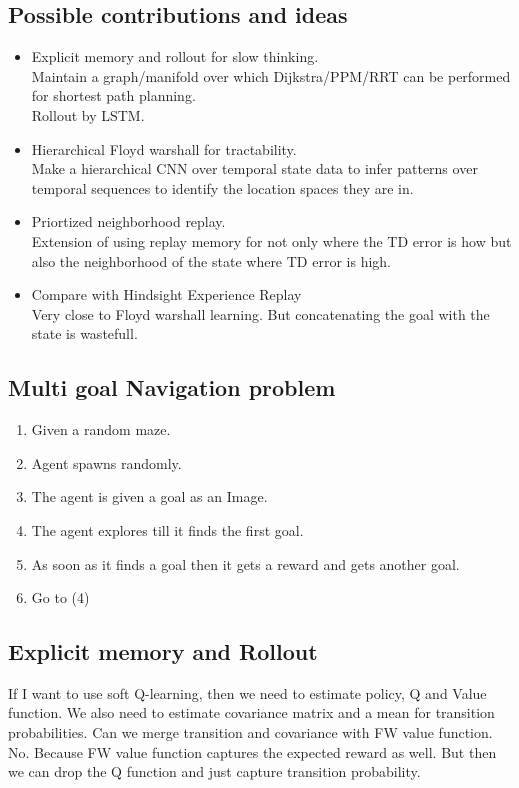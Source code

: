 \subsection{Possible contributions and ideas}
\begin{itemize}
\item Explicit memory and rollout for slow thinking.
  \\
  Maintain a graph/manifold over which Dijkstra/PPM/RRT can be
  performed for shortest path planning.
  \\
  Rollout by LSTM.
\item Hierarchical Floyd warshall for tractability.
  \\
  Make a hierarchical CNN over temporal state data to infer patterns
  over temporal sequences to identify the location spaces they are in.
\item Priortized neighborhood replay.
  \\
  Extension of using replay memory for not only where the TD error is
  how but also the neighborhood of the state where TD error is high.
\item Compare with Hindsight Experience Replay
  \\
  Very close to Floyd warshall learning.
  But concatenating the goal with the state is wastefull.
\end{itemize}

\subsection{Multi goal Navigation problem}
\begin{enumerate}
\item Given a random maze.
\item Agent spawns randomly.
\item The agent is given a goal as an Image.
\item The agent explores till it finds the first goal.
\item As soon as it finds a goal then it gets a reward and gets another goal.
\item Go to (4)
\end{enumerate}

\subsection{Explicit memory and Rollout}

If I want to use soft Q-learning, then we need to estimate policy, Q
and Value function. We also need to estimate covariance matrix and a
mean for transition probabilities.
Can we merge transition and covariance with FW value function. No.
Because FW value function captures the expected reward as well.
But then we can drop the Q function and just capture transition
probability.

